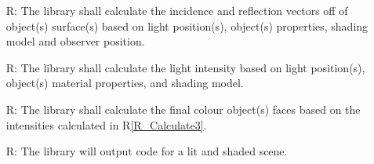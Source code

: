 \documentclass[12pt, titlepage]{article}
\newcounter{reqnum} %
\newcommand{\rref}[1]{R\ref{#1}}
\begin{document}
\begin{itemize}
	\item[R\refstepcounter{reqnum}\thereqnum \label{R_Calculate2}:] The library 
	shall calculate the incidence and reflection vectors off of object(s) 
	surface(s) based on light position(s), object(s) properties, shading model 
	and observer position.
	
	\item[R\refstepcounter{reqnum}\thereqnum \label{R_Calculate3}:] The library 
	shall calculate the light intensity based on light position(s), object(s) 
	material properties, and shading model.
	
	\item[R\refstepcounter{reqnum}\thereqnum \label{R_Calculate4}:] The library 
	shall calculate the final colour object(s) faces based on the intensities 
	calculated in \rref{R_Calculate3}.
	
	\item[R\refstepcounter{reqnum}\thereqnum \label{R_Output}:] The library 
	will output code for a lit and shaded scene.
	

\end{itemize}
\end{document}
